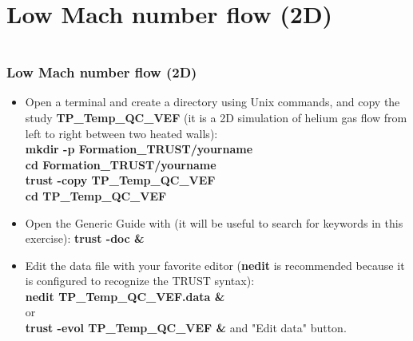 \documentclass[10pt, hyperref={unicode=true,pdfusetitle, bookmarks=true,bookmarksnumbered=false,bookmarksopen=false, breaklinks=false,pdfborder={0 0 1},backref=true,colorlinks=true,linkcolor=darkblue,pageanchor}]{beamer}
\begin{document}
\section{{\bf{Low Mach number flow (2D)}}}
\begin{frame}
\begin{columns}[c] 
\tableofcontents[sections={1-9},currentsection, currentsubsection]
\tableofcontents[sections={10-16},currentsection, currentsubsection]
\end{columns}
\end{frame}
\begin{frame}
\frametitle{Low Mach number flow (2D)}
\begin{block}{}


\begin{itemize}
\item Open a terminal and create a directory using Unix commands, and copy the study \textbf{TP\_Temp\_QC\_VEF} (it is a 2D simulation of helium gas flow from left to right between two heated walls):\\
\textbf{mkdir -p Formation\_TRUST/yourname}\\
\textbf{cd Formation\_TRUST/yourname}\\
\textbf{trust -copy TP\_Temp\_QC\_VEF}\\
\textbf{cd TP\_Temp\_QC\_VEF}

\item Open the Generic Guide with (it will be useful to search for keywords in this exercise): \textbf{trust -doc \&}

\item Edit the data file with your favorite editor (\textbf{nedit} is recommended because it is configured to recognize the TRUST syntax):\\
\textbf{nedit TP\_Temp\_QC\_VEF.data \&} \\
or \\
\textbf{trust -evol TP\_Temp\_QC\_VEF  \&} and "Edit data" button.
\end{itemize}

\end{block}
\end{frame}
\end{document}
